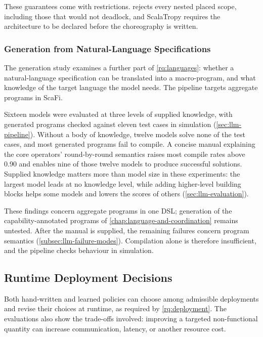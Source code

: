 These guarantees come with restrictions.
\camil rejects every nested placed scope, including those that would not deadlock,
and ScalaTropy requires the architecture to be declared before the choreography is written.

\subsubsection{Generation from Natural-Language Specifications}
\label{subsec:answer-generation}

The generation study examines a further part of \cref{rq:languages}:
whether a natural-language specification can be translated into a macro-program,
and what knowledge of the target language the model needs.
The pipeline targets aggregate programs in ScaFi.

Sixteen models were evaluated at three levels of supplied knowledge,
with generated programs checked against eleven test cases in simulation (\cref{sec:llm-pipeline}).
Without a body of knowledge, twelve models solve none of the test cases,
and most generated programs fail to compile.
A concise manual explaining the core operators' round-by-round semantics raises most compile rates above 0.90
and enables nine of those twelve models to produce successful solutions.
Supplied knowledge matters more than model size in these experiments:
the largest model leads at no knowledge level,
while adding higher-level building blocks helps some models and lowers the scores of others (\cref{sec:llm-evaluation}).

These findings concern aggregate programs in one \ac{DSL};
generation of the capability-annotated programs of \cref{chap:language-and-coordination} remains untested.
After the manual is supplied, the remaining failures concern program semantics (\cref{subsec:llm-failure-modes}).
Compilation alone is therefore insufficient, and the pipeline checks behaviour in simulation.

\subsection{Runtime Deployment Decisions}
\label{subsec:answer-deployment}

Both hand-written and learned policies can choose among admissible deployments
and revise their choices at runtime, as required by \cref{rq:deployment}.
The evaluations also show the trade-offs involved: improving a targeted non-functional quantity
can increase communication, latency, or another resource cost.

